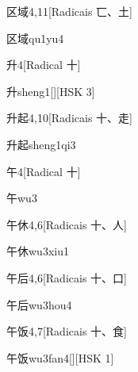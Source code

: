 \begin{entry}{区域}{4,11}[Radicais ⼖、⼟]
  \begin{phonetics}{区域}{qu1yu4}
  \end{phonetics}
\end{entry}

\begin{entry}{升}{4}[Radical ⼗]
  \begin{phonetics}{升}{sheng1}[][HSK 3]
  \end{phonetics}
\end{entry}

\begin{entry}{升起}{4,10}[Radicais ⼗、⾛]
  \begin{phonetics}{升起}{sheng1qi3}
  \end{phonetics}
\end{entry}

\begin{entry}{午}{4}[Radical ⼗]
  \begin{phonetics}{午}{wu3}
  \end{phonetics}
\end{entry}

\begin{entry}{午休}{4,6}[Radicais ⼗、⼈]
  \begin{phonetics}{午休}{wu3xiu1}
  \end{phonetics}
\end{entry}

\begin{entry}{午后}{4,6}[Radicais ⼗、⼝]
  \begin{phonetics}{午后}{wu3hou4}
  \end{phonetics}
\end{entry}

\begin{entry}{午饭}{4,7}[Radicais ⼗、⾷]
  \begin{phonetics}{午饭}{wu3fan4}[][HSK 1]
  \end{phonetics}
\end{entry}

